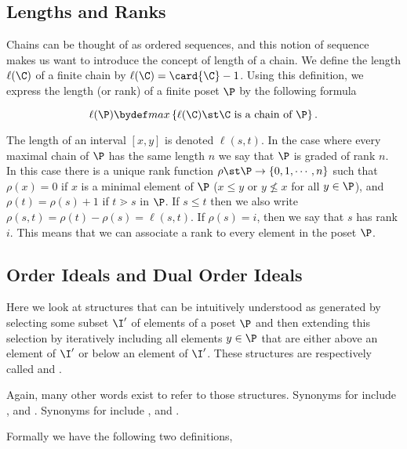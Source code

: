 \subsection*{Lengths and Ranks}

Chains can be thought of as ordered sequences, and this notion of sequence makes
us want to introduce the concept of length of a chain. We define the length
$\ell(\C)$ of a finite chain by $\ell(\C) = \card{\C} - 1$. Using this definition, we
express the length (or rank) of a finite poset $\P$ by the following formula

\begin{displaymath}
\ell(\P) \bydef max\left\{{\ell(\C) \st \C ~\text{is a chain of}~ \P}\right\}.
\end{displaymath}

The length of an interval $[x, y]$ is denoted $\ell(s, t)$. In the case where
every maximal chain of $\P$ has the same length $n$ we say that $\P$ is graded of
rank $n$. In this case there is a unique rank function $\rho \st \P \to \left\{{0,
1, \cdots , n}\right\}$ such that $\rho(x) = 0$ if $x$ is a minimal element of
$\P$ ($x \le y$ or $y \nleq x$ for all $y \in \P$), and $\rho(t) = \rho(s) + 1$
if $t \gtrdot s$ in $\P$. If $s \le t$ then we also write $\rho(s, t) = \rho(t)
- \rho(s) = \ell(s, t)$. If $\rho(s) = i$, then we say that $s$ has rank $i$.
This means that we can associate a rank to every element in the poset $\P$.


\subsection*{Order Ideals and Dual Order Ideals}

Here we look at structures that can be intuitively understood as generated by
selecting some subset $\I'$ of elements of a poset $\P$ and then extending this
selection by iteratively including all elements $y \in \P$ that
are either above an element of $\I'$ or below an element of $\I'$. These
structures are respectively called  and .

Again, many other words exist to refer to those structures. Synonyms for
 include ,  and
. Synonyms for  include
,  and .

Formally we have the following two definitions,

